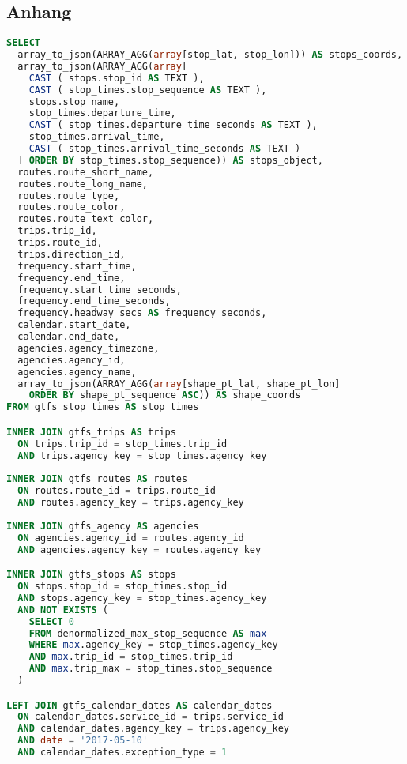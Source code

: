 \begin{newpage}
\section*{Anhang}

\begin{lstlisting}[captionpos=t, caption=Postgresql Datenbankabfrage von allen aktiven Trips mit ihrem dazugehörigen Linienverlauf, label=lst:get_active_trips_query, language=SQL]
SELECT 
  array_to_json(ARRAY_AGG(array[stop_lat, stop_lon])) AS stops_coords,
  array_to_json(ARRAY_AGG(array[
    CAST ( stops.stop_id AS TEXT ),
    CAST ( stop_times.stop_sequence AS TEXT ),
    stops.stop_name, 
    stop_times.departure_time,
    CAST ( stop_times.departure_time_seconds AS TEXT ),
    stop_times.arrival_time,
    CAST ( stop_times.arrival_time_seconds AS TEXT )
  ] ORDER BY stop_times.stop_sequence)) AS stops_object,
  routes.route_short_name,
  routes.route_long_name,
  routes.route_type,
  routes.route_color,
  routes.route_text_color,
  trips.trip_id, 
  trips.route_id,
  trips.direction_id,
  frequency.start_time, 
  frequency.end_time, 
  frequency.start_time_seconds,
  frequency.end_time_seconds,
  frequency.headway_secs AS frequency_seconds,
  calendar.start_date,
  calendar.end_date,
  agencies.agency_timezone,
  agencies.agency_id,
  agencies.agency_name,
  array_to_json(ARRAY_AGG(array[shape_pt_lat, shape_pt_lon] 
    ORDER BY shape_pt_sequence ASC)) AS shape_coords
FROM gtfs_stop_times AS stop_times

INNER JOIN gtfs_trips AS trips
  ON trips.trip_id = stop_times.trip_id 
  AND trips.agency_key = stop_times.agency_key
    
INNER JOIN gtfs_routes AS routes
  ON routes.route_id = trips.route_id 
  AND routes.agency_key = trips.agency_key
   
INNER JOIN gtfs_agency AS agencies
  ON agencies.agency_id = routes.agency_id 
  AND agencies.agency_key = routes.agency_key

INNER JOIN gtfs_stops AS stops 
  ON stops.stop_id = stop_times.stop_id
  AND stops.agency_key = stop_times.agency_key
  AND NOT EXISTS (
    SELECT 0
    FROM denormalized_max_stop_sequence AS max
    WHERE max.agency_key = stop_times.agency_key
    AND max.trip_id = stop_times.trip_id
    AND max.trip_max = stop_times.stop_sequence
  )

LEFT JOIN gtfs_calendar_dates AS calendar_dates
  ON calendar_dates.service_id = trips.service_id
  AND calendar_dates.agency_key = trips.agency_key
  AND date = '2017-05-10' 
  AND calendar_dates.exception_type = 1


\end{lstlisting}
\end{newpage}
